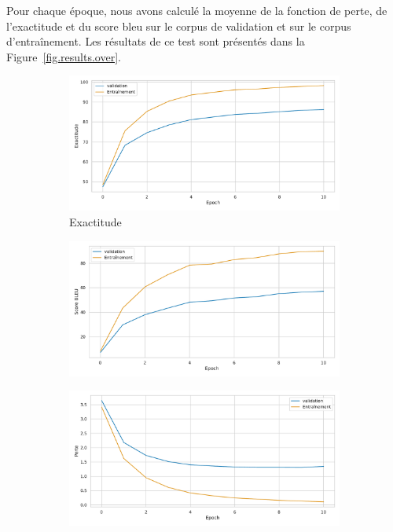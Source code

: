 Pour chaque époque, nous avons calculé la moyenne de la fonction de perte, de l'exactitude et du score \gls{bleu} 
sur le corpus de validation et sur le corpus d'entraînement.
Les résultats de ce test sont présentés dans la Figure~\ref{fig.results.over}.
\begin{figure}[hbt]
    \begin{subfigure}{.5\textwidth}
        \caption{Exactitude}
        \begin{center}
            \includegraphics[width=\textwidth]{assets/python/over-accuracy.pdf}
        \end{center}
        \label{fig.results.over.accuracy}
    \end{subfigure}
    \begin{subfigure}{.5\textwidth}
        \caption{}
        \begin{center}
            \includegraphics[width=\textwidth]{assets/python/over-bleu.pdf}
        \end{center}
        \label{fig.results.over.bleu}
    \end{subfigure}
    \begin{subfigure}{.5\textwidth}
        \begin{center}
            \includegraphics[width=\textwidth]{assets/python/over-loss.pdf}

\end{center}
\end{subfigure}
\end{figure}
